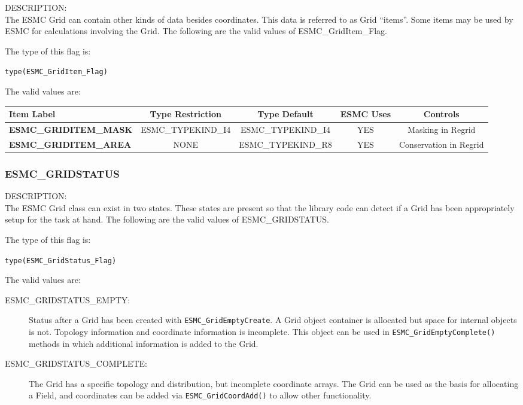 {\sf DESCRIPTION:\\}
The ESMC Grid can contain other kinds of data besides coordinates. 
This data is referred to as Grid ``items''. Some items may be used
by ESMC for calculations involving the Grid. The following
are the valid values of ESMC\_GridItem\_Flag.

The type of this flag is:

{\tt type(ESMC\_GridItem\_Flag)}

The valid values are:
\newline
\begin{tabular}{|l|c|c|c|c||}
\hline
\hline
Item Label & {\bf Type Restriction}  & {\bf Type Default} & {\bf ESMC Uses} & {\bf Controls} \\
\hline
{\bf ESMC\_GRIDITEM\_MASK}  & ESMC\_TYPEKIND\_I4 & ESMC\_TYPEKIND\_I4 & YES & Masking in Regrid \\
{\bf ESMC\_GRIDITEM\_AREA} & NONE & ESMC\_TYPEKIND\_R8 & YES & Conservation in Regrid \\
\hline
\hline
\end{tabular}


\subsubsection{ESMC\_GRIDSTATUS}
\label{const:cgridstatus}

{\sf DESCRIPTION:\\}
The ESMC Grid class can exist in two states. These states are
present so that the library code can detect if a Grid has been
appropriately setup for the task at hand. The following
are the valid values of ESMC\_GRIDSTATUS.

The type of this flag is:

{\tt type(ESMC\_GridStatus\_Flag)}

The valid values are:
\begin{description}
\item [ESMC\_GRIDSTATUS\_EMPTY:] Status after a Grid has been created with 
      {\tt ESMC\_GridEmptyCreate}.  A Grid object container is allocated but
      space for internal objects is not.  Topology information and coordinate
      information is incomplete.  This object can be used in {\tt ESMC\_GridEmptyComplete()}
      methods in which additional information is added to the Grid.
\item [ESMC\_GRIDSTATUS\_COMPLETE:] The Grid has a specific topology and
      distribution, but incomplete coordinate arrays.  The Grid can be used
      as the basis for allocating a Field, and coordinates can be added
      via {\tt ESMC\_GridCoordAdd()} to allow other functionality. 
\end{description}


